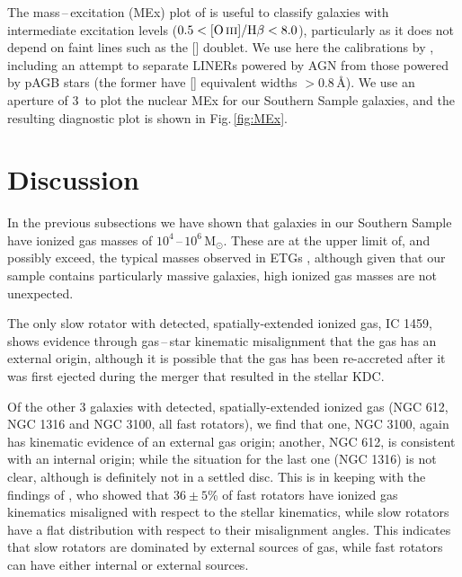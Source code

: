 		The mass\,--\,excitation (MEx) plot of \citet{Juneau2011} is useful to classify galaxies with intermediate excitation levels ($0.5 < \mathrm{[\ion{O}{iii}]/H\beta} < 8.0$), particularly as it does not depend on faint lines such as the [] doublet. We use here the calibrations by \citet{Nyland2016}, including an attempt to separate LINERs powered by AGN from those powered by pAGB stars (the former have [] equivalent widths $>0.8$\,\AA). We use an aperture of 3\arcsec\ to plot the nuclear MEx for our Southern Sample galaxies, and the resulting diagnostic plot is shown in Fig.\,\ref{fig:MEx}. 




\section{Discussion}
	\label{sec:gasDiscussion}
	In the previous subsections we have shown that galaxies in our Southern Sample have ionized gas masses of $10^4$\,--\,$10^6\,\mathrm{M_\odot}$. These are at the upper limit of, and possibly exceed, the typical masses observed in ETGs \citep[e.g.][]{Phillips1986, Zeilinger1996, Sarzi2005}, although given that our sample contains particularly massive galaxies, high ionized gas masses are not unexpected. 

	The only slow rotator with detected, spatially-extended ionized gas, IC 1459, shows evidence through gas\,--\,star kinematic misalignment that the gas has an external origin, although it is possible that the gas has been re-accreted after it was first ejected during the merger that resulted in the stellar KDC. 

	Of the other 3 galaxies with detected, spatially-extended ionized gas (NGC 612, NGC 1316 and NGC 3100, all fast rotators), we find that one, NGC 3100, again has kinematic evidence of an external gas origin; another, NGC 612, is consistent with an internal origin; while the situation for the last one (NGC 1316) is not clear, although is definitely not in a settled disc. This is in keeping with the findings of \citet{Davis2011a}, who showed that $36\pm5$\% of fast rotators have ionized gas kinematics misaligned with respect to the stellar kinematics, while slow rotators have a flat distribution with respect to their misalignment angles. This indicates that slow rotators are dominated by external sources of gas, while fast rotators can have either internal or external sources. 

